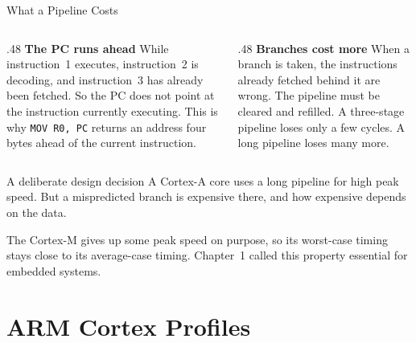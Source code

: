 \documentclass[9pt,aspectratio=169,xcolor=table]{beamer}
\begin{document}
\begin{frame}{What a Pipeline Costs}
    \begin{columns}[T]
    \begin{column}{.48\textwidth}
        \textbf{The PC runs ahead}
        \vspace{1mm}
        {\small While instruction~1 executes, instruction~2 is decoding, and instruction~3 has already been fetched. So the PC does not point at the instruction currently executing.}
        \vspace{2mm}
        {\small This is why \texttt{MOV R0, PC} returns an address four bytes ahead of the current instruction.}
    \end{column}
    \begin{column}{.48\textwidth}
        \textbf{Branches cost more}
        \vspace{1mm}
        {\small When a branch is taken, the instructions already fetched behind it are wrong. The pipeline must be cleared and refilled.}
        \vspace{2mm}
        {\small A three-stage pipeline loses only a few cycles. A long pipeline loses many more.}
    \end{column}
    \end{columns}
    \vspace{3mm}
    \begin{block}{A deliberate design decision}
        A Cortex-A core uses a long pipeline for high peak speed. But a mispredicted branch is expensive there, and how expensive depends on the data.

        The Cortex-M gives up some peak speed on purpose, so its worst-case timing stays close to its average-case timing. Chapter~1 called this property essential for embedded systems.
    \end{block}
\end{frame}

\section{ARM Cortex Profiles}
\end{document}
